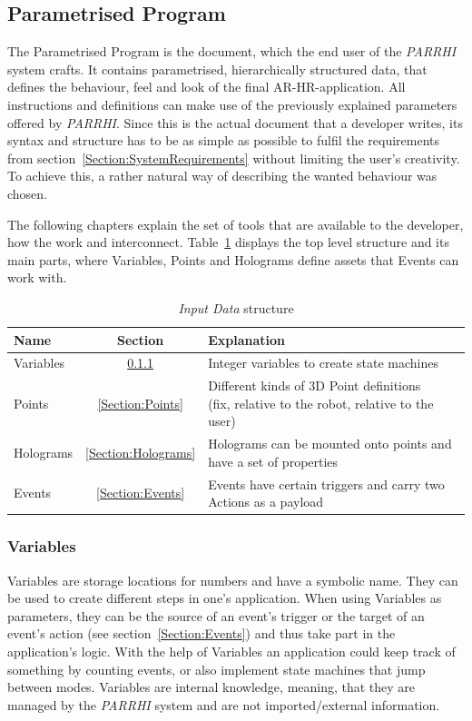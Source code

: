 \clearpage
\subsection{Parametrised Program}

The Parametrised Program is the document, which the end user of the \textit{PARRHI} system crafts. It contains parametrised, hierarchically structured data, that defines the behaviour, feel and look of the final AR-HR-application. All instructions and definitions can make use of the previously explained parameters offered by \textit{PARRHI}. Since this is the actual document that a developer writes, its syntax and structure has to be as simple as possible to fulfil the requirements from section~\ref{Section:SystemRequirements} without limiting the user's creativity. To achieve this, a rather natural way of describing the wanted behaviour was chosen. 

The following chapters explain the set of tools that are available to the developer, how the work and interconnect. Table~\ref{Table:InputDataStructure} displays the top level structure and its main parts, where Variables, Points and Holograms define assets that Events can work with. 

\begin{table}[ht]
	\caption{\textit{Input Data} structure}
	\label{Table:InputDataStructure}
	\centering
	\begin{tabular}{lcl}
		\toprule
		Name & Section		& Explanation	\\		
		\midrule
		Variables & \ref{Section:Variables}		& Integer variables to create state machines \\
		Points& \ref{Section:Points}		& \parbox[t]{10cm}{Different kinds of 3D Point definitions\\(fix, relative to the robot, relative to the user)} 	 \\
		Holograms& \ref{Section:Holograms} & Holograms can be mounted onto points and have a set of properties\\
		Events& \ref{Section:Events} & Events have certain triggers and carry two Actions as a payload \\
		\bottomrule
	\end{tabular}
\end{table}

\subsubsection{Variables}\label{Section:Variables}
Variables are storage locations for numbers and have a symbolic name. They can be used to create different steps in one's application. When using Variables as parameters, they can be the source of an event's trigger or the target of an event's action (see section~\ref{Section:Events}) and thus take part in the application's logic. With the help of Variables an application could keep track of something by counting events, or also implement state machines that jump between modes. Variables are internal knowledge, meaning, that they are managed by the \textit{PARRHI} system and are not imported/external information.

